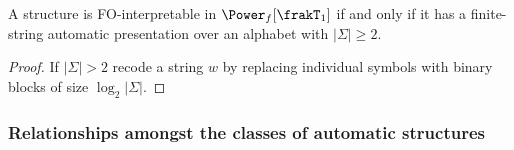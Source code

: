 \begin{proposition} \label{AS:prop:MTC}
A structure is FO-interpretable in $\Power_f[\frakT_1]$ if and only if it 
has a finite-string automatic presentation over an alphabet with $|\Sigma| \geq 2$.
\end{proposition}

\begin{proof}
If $|\Sigma| > 2$ recode a string $w$ by replacing individual symbols with binary blocks of size $\log_2 |\Sigma|$.
\end{proof}









\subsubsection*{Relationships amongst the classes of automatic structures}

